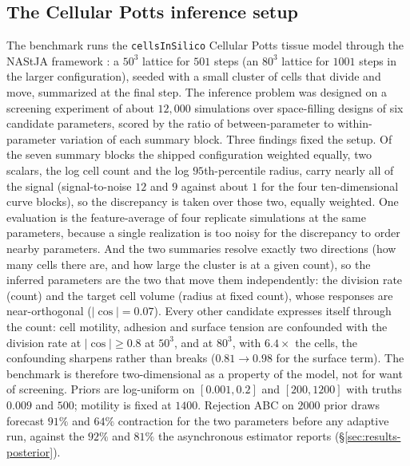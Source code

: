 \documentclass[pdflatex,sn-mathphys-num]{sn-jnl}
\theoremstyle{plain}
\theoremstyle{definition}
\begin{document}
\begin{appendices}
\section{The Cellular Potts inference setup}\label{app:cpm}
The benchmark runs the \texttt{cellsInSilico} Cellular Potts tissue model \cite{berghoff2020cis} through the NAStJA framework \cite{berghoff2018nastja}: a $50^3$ lattice for $501$ steps (an $80^3$ lattice for $1001$ steps in the larger configuration), seeded with a small cluster of cells that divide and move, summarized at the final step. The inference problem was designed on a screening experiment of about $12{,}000$ simulations over space-filling designs of six candidate parameters, scored by the ratio of between-parameter to within-parameter variation of each summary block. Three findings fixed the setup. Of the seven summary blocks the shipped configuration weighted equally, two scalars, the log cell count and the log $95$th-percentile radius, carry nearly all of the signal (signal-to-noise $12$ and $9$ against about $1$ for the four ten-dimensional curve blocks), so the discrepancy is taken over those two, equally weighted. One evaluation is the feature-average of four replicate simulations at the same parameters, because a single realization is too noisy for the discrepancy to order nearby parameters. And the two summaries resolve exactly two directions (how many cells there are, and how large the cluster is at a given count), so the inferred parameters are the two that move them independently: the division rate (count) and the target cell volume (radius at fixed count), whose responses are near-orthogonal ($|\cos|=0.07$). Every other candidate expresses itself through the count: cell motility, adhesion and surface tension are confounded with the division rate at $|\cos|\ge0.8$ at $50^3$, and at $80^3$, with $6.4\times$ the cells, the confounding sharpens rather than breaks ($0.81\to0.98$ for the surface term). The benchmark is therefore two-dimensional as a property of the model, not for want of screening. Priors are log-uniform on $[0.001,0.2]$ and $[200,1200]$ with truths $0.009$ and $500$; motility is fixed at $1400$. Rejection ABC on $2000$ prior draws forecast $91\%$ and $64\%$ contraction for the two parameters before any adaptive run, against the $92\%$ and $81\%$ the asynchronous estimator reports (\S\ref{sec:results-posterior}).


\end{appendices}
\end{document}
